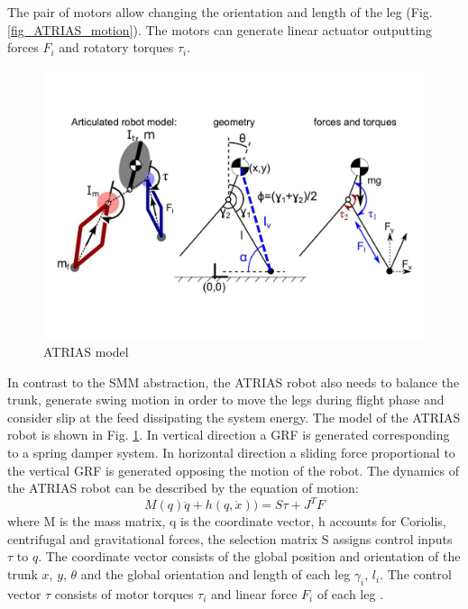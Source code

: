 \documentclass[10pt, conference]{IEEEtran}
\begin{document}
The pair of motors allow changing the orientation and length of the leg (Fig. \ref{fig_ATRIAS_motion}). The motors can generate linear actuator outputting forces \({F}_{i} \) and rotatory torques
 \({\tau}_{i} \).  

\begin{figure}[h]
   \centering
   \includegraphics[scale=0.23]{"assets/ATRIAS1.pdf"}
   \caption{ATRIAS model \cite{Wu2014}}
   \label{fig_ATRIAS}
\end{figure}

In contrast to the SMM abstraction, the ATRIAS robot also needs to balance the trunk, generate swing motion in order to move the legs during flight phase and 
consider slip at the feed dissipating the system energy. The model of the ATRIAS robot is shown in Fig. \ref{fig_ATRIAS}. In vertical direction a GRF is generated
corresponding to a spring damper system. In horizontal direction a sliding force proportional to the vertical GRF is generated opposing the motion of 
the robot. The dynamics of the ATRIAS robot can be described by the equation of motion:
\begin{equation}
   M(q)\ddot{q}+h(q,\dot{x}))=S{\tau}+{J}^TF 
\end{equation}
where M is the mass matrix, q is the coordinate vector, h accounts for Coriolis, centrifugal and gravitational forces, the selection matrix S assigns control inputs 
\({\tau}\) to \(q\). The coordinate vector consists of the global position and orientation of the trunk \(x\), \(y\), \({\theta}\) and the global orientation and 
length of each leg \({\gamma}_i\), \({l}_i\). The control vector \({\tau}\) consists of motor torques \({\tau}_i\) and linear force \({F}_i\) of each leg \cite{Wu2014} \cite{Grimes2012}.       
\end{document}
